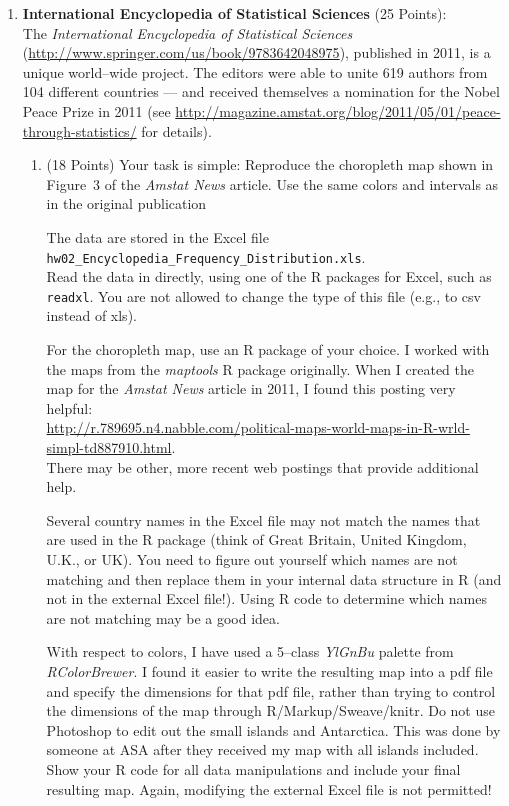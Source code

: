 \documentclass[12pt,letterpaper,final]{article}
\begin{document}
\begin{enumerate}

\item {\bf International Encyclopedia of Statistical Sciences} (25 Points): \\
The {\it International Encyclopedia of
Statistical Sciences} (\url{http://www.springer.com/us/book/9783642048975}),
published in 2011, is a unique world--wide project. The editors were
able to unite 619 authors from 104 different countries --- and
received themselves a nomination for the Nobel Peace Prize in 2011
(see \url{http://magazine.amstat.org/blog/2011/05/01/peace-through-statistics/}
for details).

\begin{enumerate} 
\item (18 Points)
Your task is simple: Reproduce the choropleth map shown in Figure~3 of 
the {\it Amstat News} article. Use the same colors and intervals as
in the original publication

The data are stored in the Excel file \\
\hspace*{2cm}\verb|hw02_Encyclopedia_Frequency_Distribution.xls|. \\
Read the data in directly,
using one of the R packages for Excel, such as \verb|readxl|.
You are not allowed to change the type of this file (e.g., to csv instead of xls).

For the choropleth map, use an R package of your choice. 
I worked with the maps from the {\it maptools} R package originally.
When I created the map for the {\it Amstat News} article in 2011, 
I found this posting very helpful: \\
{\scriptsize
\url{http://r.789695.n4.nabble.com/political-maps-world-maps-in-R-wrld-simpl-td887910.html}. } \\
There may be other, more recent web postings that provide additional help.

Several country names in the Excel file may not match the names that are used
in the R package (think of Great Britain, United Kingdom, U.K., or UK).
You need to figure out yourself which names are not matching and then replace
them in your internal data structure in R (and not in the external Excel file!).
Using R code to determine which names are not matching may be a good idea.

With respect to colors, I have used a 5--class {\it YlGnBu} palette from {\it RColorBrewer}.
I found it easier to write the resulting map into a pdf file and
specify the dimensions for that pdf file, rather than trying to control
the dimensions of the map through R/Markup/Sweave/knitr.
Do not use Photoshop to edit out the small islands and Antarctica.
This was done by someone at ASA after they received my
map with all islands included. \frownie{}
Show your R code for all data manipulations and include your final resulting map.
Again, modifying the external Excel file is not permitted! \\



\end{enumerate}
\end{enumerate}
\end{document}

